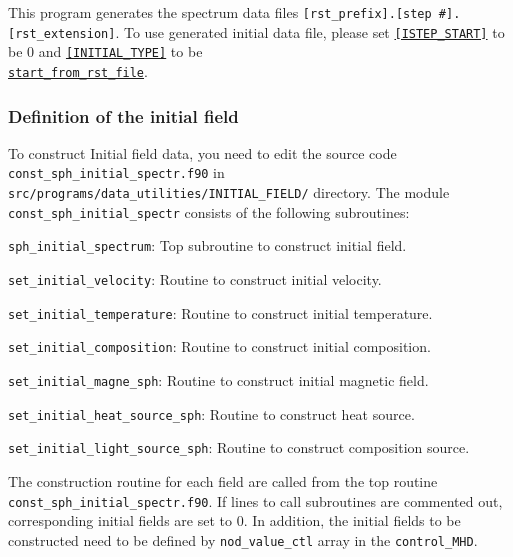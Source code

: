 %
This program generates the spectrum data files \verb|[rst_prefix].[step #].[rst_extension]|. To use generated initial data file, please set 
\hyperref[href_t:i_step_init_ctl]{{\tt [ISTEP\_START]}} to be 0 and \hyperref[href_t:restart_file_ctl]{{\tt [INITIAL\_TYPE]}} to be \\
\hyperref[href_t:restart_file_ctl]{{\tt start\_from\_rst\_file}}.

\subsubsection{Definition of the initial field}
\label{sec:def_initial}
To construct Initial field data, you need to edit the source code \verb|const_sph_initial_spectr.f90| in \verb|src/programs/data_utilities/INITIAL_FIELD/| directory. The module \verb|const_sph_initial_spectr| consists of the following subroutines:
%
\begin{description}
\item{\verb|sph_initial_spectrum|:}    Top subroutine to construct initial field.
\item{\verb|set_initial_velocity|:}        Routine to construct initial velocity.
\item{\verb|set_initial_temperature|:} Routine to construct initial temperature.
\item{\verb|set_initial_composition|:} Routine to construct initial composition.
\item{\verb|set_initial_magne_sph|:} Routine to construct initial magnetic field.
\item{\verb|set_initial_heat_source_sph|:} Routine to construct heat source.
\item{\verb|set_initial_light_source_sph|:}  Routine to construct composition source.
\end{description}
%
The construction routine for each field are called from the top routine \\
\verb|const_sph_initial_spectr.f90|. If lines to call subroutines are commented out, corresponding initial fields are set to 0. In addition, the initial fields to be constructed need to be defined by \verb|nod_value_ctl| array in the \verb|control_MHD|.
%
